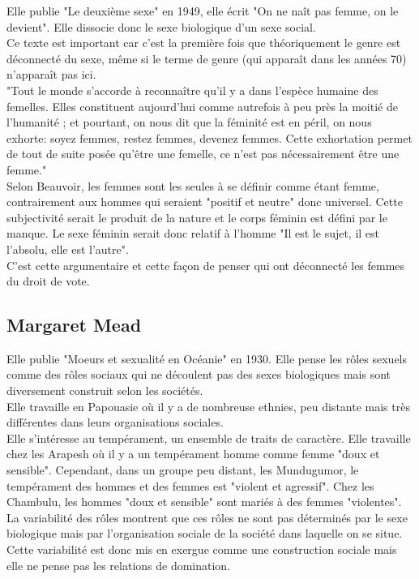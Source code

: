 \documentclass[10pt, a4paper, openany]{book}
\begin{document}
Elle publie "Le deuxième sexe" en 1949, elle écrit "On ne naît pas femme, on le devient". Elle dissocie donc le sexe biologique d'un sexe social. \\
Ce texte est important car c'est la première fois que théoriquement le genre est déconnecté du sexe, même si le terme de genre (qui apparaît dans les années 70) n'apparaît pas ici. \\
"Tout le monde s'accorde à reconnaître qu'il y a dans l'espèce humaine des femelles. Elles constituent aujourd'hui comme autrefois à peu près la moitié de l'humanité ; et pourtant, on nous dit que la féminité est en péril, on nous exhorte: soyez femmes, restez femmes, devenez femmes. Cette exhortation permet de tout de suite posée qu'être une femelle, ce n'est pas nécessairement être une femme." \\
Selon Beauvoir, les femmes sont les seules à se définir comme étant femme, contrairement aux hommes qui seraient "positif et neutre" donc universel. Cette subjectivité serait le produit de la nature et le corps féminin est défini par le manque. Le sexe féminin serait donc relatif à l'homme "Il est le sujet, il est l'absolu, elle est l'autre". \\
C'est cette argumentaire et cette façon de penser qui ont déconnecté les femmes du droit de vote.

\subsection{Margaret Mead}

Elle publie "Moeurs et sexualité en Océanie" en 1930. Elle pense les rôles sexuels comme des rôles sociaux qui ne découlent pas des sexes biologiques mais sont diversement construit selon les sociétés. \\
Elle travaille en Papouasie où il y a de nombreuse ethnies, peu distante mais très différentes dans leurs organisations sociales. \\
Elle s'intéresse au tempérament, un ensemble de traits de caractère. Elle travaille chez les Arapesh où il y a un tempérament homme comme femme "doux et sensible". Cependant, dans un groupe peu distant, les Mundugumor, le tempérament des hommes et des femmes est "violent et agressif". Chez les Chambulu, les hommes "doux et sensible" sont mariés à des femmes "violentes". \\
La variabilité des rôles montrent que ces rôles ne sont pas déterminés par le sexe biologique mais par l'organisation sociale de la société dans laquelle on se situe. \\
Cette variabilité est donc mis en exergue comme une construction sociale mais elle ne pense pas les relations de domination. 
\end{document}
